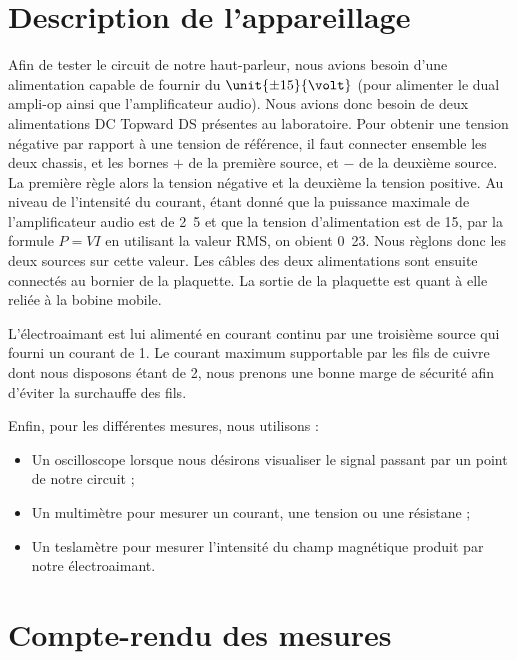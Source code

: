 

\section{Description de l'appareillage}
Afin de tester le circuit de notre haut-parleur, nous avions besoin d'une alimentation
capable de fournir du $\unit{\pm 15}{\volt}$ (pour alimenter le dual ampli-op ainsi
que l'amplificateur audio). Nous avions donc besoin de deux alimentations DC Topward 
 DS présentes au laboratoire. Pour obtenir une tension négative par 
rapport à une tension de référence, il faut connecter ensemble les deux chassis,
et les bornes $+$ de la première source, et $-$ de la deuxième source. La première règle
alors la tension négative et la deuxième la tension positive\cite{dctopward}.
Au niveau de l'intensité du courant, étant donné que la puissance maximale de l'amplificateur
audio est de \unit{2.5}{\watt}\cite{datasheetampli} et que la tension d'alimentation est de \unit{15}{\volt}, par
la formule $P = VI$ en utilisant la valeur RMS, on obient \unit{0.23}{\ampere}. Nous règlons
donc les deux sources sur cette valeur. Les câbles des deux alimentations sont ensuite connectés 
au bornier de la plaquette. La sortie de la plaquette est quant à elle reliée à la bobine mobile.


L'électroaimant est lui alimenté en courant continu par une troisième source qui 
fourni un courant de \unit{1}{\ampere}. Le courant maximum supportable par les fils de 
cuivre dont nous disposons étant de \unit{2}{\ampere}\cite{norme-cuivre}, nous prenons
une bonne marge de sécurité afin d'éviter la surchauffe des fils.

Enfin, pour les différentes mesures, nous utilisons :

\begin{itemize}
	\item Un oscilloscope lorsque nous désirons visualiser le signal passant par un point de notre circuit ;
	\item Un multimètre pour mesurer un courant, une tension ou une résistane ;
	\item Un teslamètre pour mesurer l'intensité du champ magnétique produit par notre électroaimant.
\end{itemize}

\section{Compte-rendu des mesures}

